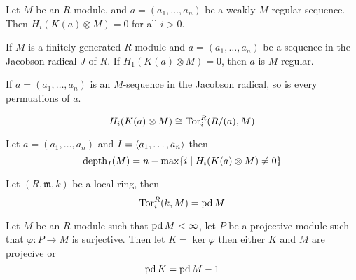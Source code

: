 \begin{definition}
\begin{theorem}
	\label{thm:reg_seq_implies_koszul_exact}
	Let $M$ be an $R$-module, and $a = (a_1, \dots, a_n)$ be a weakly $M$-regular sequence.
	Then $H_i(K(a) \otimes M) = 0$ for all $i > 0$.
\end{theorem}

\begin{lemma}
	\label{lem:reg_in_jrad_iff_koszul_exact}
	If $M$ is a finitely generated $R$-module and $a = (a_1, \dots, a_n)$ be a sequence in the Jacobson radical $J$ of $R$.
	If $H_1(K(a) \otimes M) = 0$, then $a$ is $M$-regular.
\end{lemma}

\begin{corollary}
	\label{cor:perm_of_reg_seq_in_jrad_is_reg}
	If $a = (a_1, \dots, a_n)$ is an $M$-sequence in the Jacobson radical, so is every permuations of $a$.
\end{corollary}

\begin{lemma}
	\label{thm:KoszulComplex_res_quotient_ring}
\end{lemma}

\begin{lemma}
	\label{lem:tor_measures_koszul_homology}
	$$H_i(K(a) \otimes M) \cong \operatorname{Tor}_i^R (R/(a), M)$$
\end{lemma}

\begin{lemma}
	\label{lem:koszul_homology_mesures_depth}
	Let $a = (a_1, \dots, a_n)$ and $I = \langle a_1, \dots, a_n\rangle$ then
	$$\operatorname{depth}_I(M) = n - \max\{i \mid H_i(K(a) \otimes M) \neq 0\}$$
\end{lemma}

\begin{lemma}
	\label{lem:tor_eq_pd_if_local}
	Let $(R, \mathfrak{m}, k)$ be a local ring, then
	$$\operatorname{Tor}_i^R(k, M) = \operatorname{pd} M$$
\end{lemma}

\begin{proposition}
	\label{prop:globdim_eq_projdim_of_residue}
\end{proposition}

\begin{lemma}
	\label{lem:projdim_ker_eq_one_less}
	Let $M$ be an $R$-module such that $\operatorname{pd} M < \infty$, let $P$ be a projective module such that $\varphi: P \to M$ is surjective.
	Then let $K = \ker \varphi$ then either $K$ and $M$ are projecive or
	$$\operatorname{pd} K = \operatorname{pd} M - 1$$
\end{lemma}


\end{definition}
